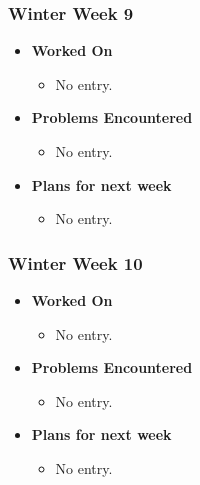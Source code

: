 \documentclass{article}
\begin{document}
\subsubsection{Winter Week 9}
\begin{itemize}
    \item {\textbf{Worked On}}
    \begin{itemize}
      \item No entry.
    \end{itemize}

    \item {\textbf{Problems Encountered}}
    \begin{itemize}
      \item No entry.
    \end{itemize}

    \item{\textbf{Plans for next week}}
    \begin{itemize}
      \item No entry.
    \end{itemize}

\end{itemize}

\subsubsection{Winter Week 10}
\begin{itemize}
    \item {\textbf{Worked On}}
    \begin{itemize}
      \item No entry.
    \end{itemize}

    \item {\textbf{Problems Encountered}}
    \begin{itemize}
      \item No entry.
    \end{itemize}

    \item{\textbf{Plans for next week}}
    \begin{itemize}
      \item No entry.
    \end{itemize}

\end{itemize}
\end{document}
